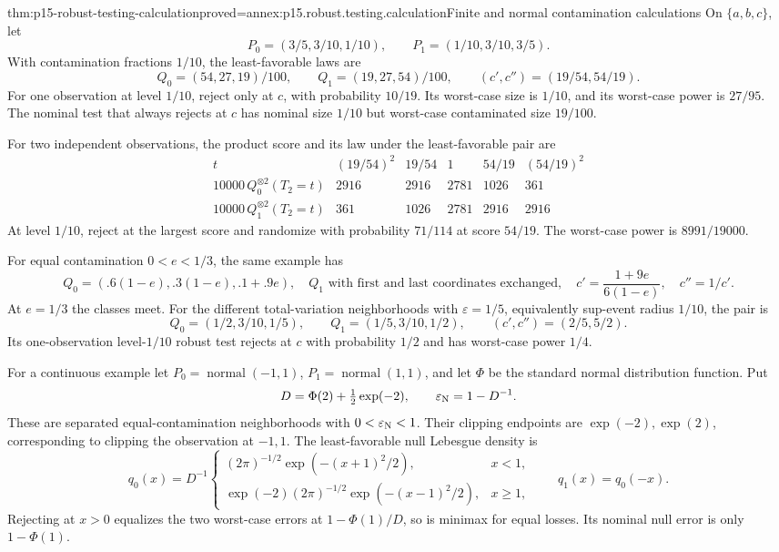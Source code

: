 \begin{hbtheorem}{thm:p15-robust-testing-calculation}{proved=annex:p15.robust.testing.calculation}{Finite and normal contamination calculations}
On \(\{a,b,c\}\), let
\[
 P_0=(3/5,3/10,1/10),\qquad P_1=(1/10,3/10,3/5).
\]
With contamination fractions \(1/10\), the least-favorable laws are
\[
 Q_0=(54,27,19)/100,\qquad Q_1=(19,27,54)/100,
 \qquad (c',c'')=(19/54,54/19).
\]
For one observation at level \(1/10\), reject only at \(c\), with
probability \(10/19\). Its worst-case size is \(1/10\), and its
worst-case power is \(27/95\).
The nominal test that always rejects at \(c\) has nominal size \(1/10\)
but worst-case contaminated size \(19/100\).

For two independent observations, the product score and its law under
the least-favorable pair are
\[
\begin{array}{c|ccccc}
t&(19/54)^2&19/54&1&54/19&(54/19)^2\\ \hline
10000\,Q_0^{\otimes2}(T_2=t)&2916&2916&2781&1026&361\\
10000\,Q_1^{\otimes2}(T_2=t)&361&1026&2781&2916&2916
\end{array}
\]
At level \(1/10\), reject at the largest score and randomize with
probability \(71/114\) at score \(54/19\). The worst-case power is
\(8991/19000\).

For equal contamination \(0<e<1/3\), the same example has
\[
 Q_0=(.6(1-e),.3(1-e),.1+.9e),\quad Q_1
       \text{ with first and last coordinates exchanged},
 \quad c'=\frac{1+9e}{6(1-e)},\quad c''=1/c'.
\]
At \(e=1/3\) the classes meet.
For the different total-variation neighborhoods with
\(\varepsilon=1/5\), equivalently sup-event radius \(1/10\), the pair is
\[
 Q_0=(1/2,3/10,1/5),\qquad Q_1=(1/5,3/10,1/2),
 \qquad(c',c'')=(2/5,5/2).
\]
Its one-observation level-\(1/10\) robust test rejects at \(c\) with
probability \(1/2\) and has worst-case power \(1/4\).

For a continuous example let \(P_0=\operatorname{normal}(-1,1)\),
\(P_1=\operatorname{normal}(1,1)\), and let \(\Phi\) be the standard
normal distribution function. Put
\[
 D=\Phi(2)+\tfrac12\exp(-2),\qquad \varepsilon_{\rm N}=1-D^{-1}.
\]
These are separated equal-contamination neighborhoods with
\(0<\varepsilon_{\rm N}<1\).
Their clipping endpoints are \(\exp(-2),\exp(2)\), corresponding to clipping
the observation at \(-1,1\). The least-favorable null Lebesgue density is
\[
 q_0(x)=D^{-1}
 \begin{cases}
 (2\pi)^{-1/2}\exp(-(x+1)^2/2),&x<1,\\
 \exp(-2)(2\pi)^{-1/2}\exp(-(x-1)^2/2),&x\geq1,
 \end{cases}
 \qquad q_1(x)=q_0(-x).
\]
Rejecting at \(x>0\) equalizes the two worst-case errors at
\(1-\Phi(1)/D\), so is minimax for equal losses.
Its nominal null error is only \(1-\Phi(1)\).
\end{hbtheorem}

